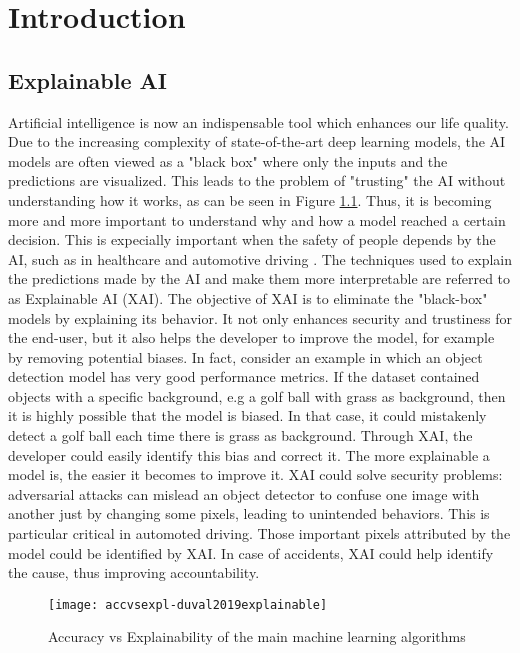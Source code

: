 \chapter{Introduction}
\label{ch:intro}

\section{Explainable AI}
Artificial intelligence is now an indispensable tool which enhances our life quality.
Due to the increasing complexity of state-of-the-art deep learning models, the AI models are often viewed as a "black box" where only the inputs and the predictions are visualized. This leads to the problem of "trusting" the AI without understanding how it works, as can be seen in Figure \ref{fig:accvsexpl}. Thus, it is becoming more and more important to understand why and how a model reached a certain decision. This is expecially important when the safety of people depends by the AI, such as in healthcare and automotive driving \cite{abeloos2022explaining}.
The techniques used to explain the predictions made by the AI and make them more interpretable are referred to as Explainable AI (XAI). The objective of XAI is to eliminate the "black-box" models by explaining its behavior.
It not only enhances security and trustiness for the end-user, but it also helps the developer to improve the model, for example by removing potential biases. In fact, consider an example in which an object detection model has very good performance metrics. If the dataset contained objects with a specific background, e.g a golf ball with grass as background, then it is highly possible that the model is biased. In that case, it could mistakenly detect a golf ball each time there is grass as background. Through XAI, the developer could easily identify this bias and correct it.
The more explainable a model is, the easier it becomes to improve it. 
XAI could solve security problems: adversarial attacks can mislead an object detector to confuse one image with another just by changing some pixels, leading to unintended behaviors. This is particular critical in automoted driving. Those important pixels attributed by the model could be identified by XAI.
In case of accidents, XAI could help identify the cause, thus improving accountability.

\begin{figure}[h]
    \centering
    \texttt{[image: accvsexpl-duval2019explainable]}
    \caption{Accuracy vs Explainability of the main machine learning algorithms \cite{duval2019explainable}}
    \label{fig:accvsexpl}
    \end{figure}


